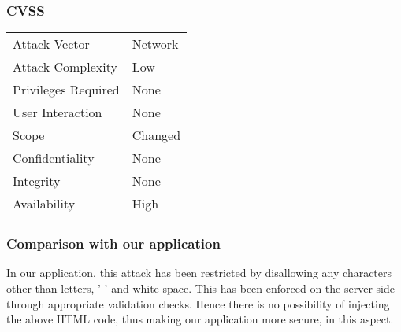 \subsubsection{CVSS}
\begin{tabular}{l | l}
Attack Vector		& Network \\
Attack Complexity	& Low \\
Privileges Required & None \\
User Interaction	& None \\
Scope				& Changed \\
Confidentiality		& None \\
Integrity			& None \\
Availability		& High
\end{tabular}

\subsubsection{Comparison with our application}
In our application, this attack has been restricted by disallowing any characters other than letters, '-' and white space. This has been enforced on the server-side through appropriate validation checks. Hence there is no possibility of injecting the above HTML code, thus making our application more secure, in this aspect.
\clearpage